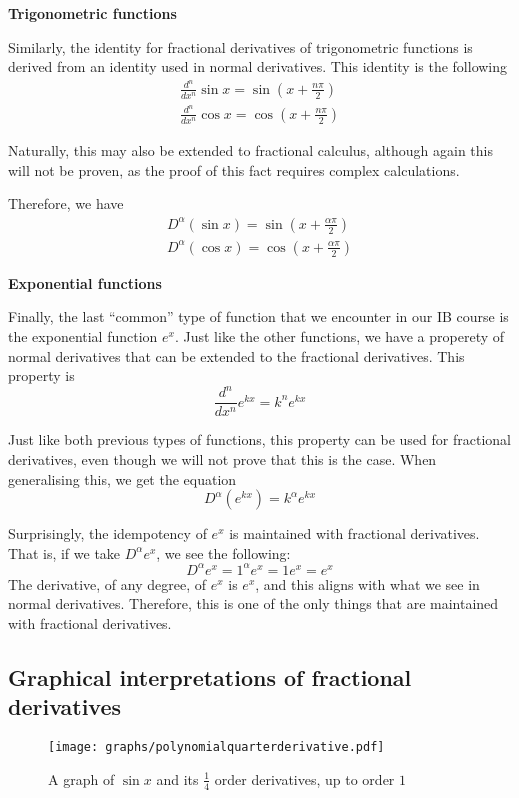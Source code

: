 \documentclass{article}
\def\graphscale{0.7}
\begin{document}
\textbf{Trigonometric functions}

Similarly, the identity for fractional derivatives of trigonometric functions
is derived from an identity used in normal derivatives. This identity is the
following
\begin{gather*}
\frac{d^n}{dx^n} \sin{x} = \sin\left(x + \frac{n\pi}{2}\right) \\
\frac{d^n}{dx^n} \cos{x} = \cos\left(x + \frac{n\pi}{2}\right)
\end{gather*}
\parencite{simplybeautifulart2016}

Naturally, this may also be extended to fractional calculus, although again
this will not be proven, as the proof of this fact requires complex
calculations.

Therefore, we have
\begin{gather*}
D^\alpha \left(\sin{x}\right) = \sin\left(x + \frac{\alpha\pi}{2}\right) \\
D^\alpha \left(\cos{x}\right) = \cos\left(x + \frac{\alpha\pi}{2}\right)
\end{gather*}

\textbf{Exponential functions}

Finally, the last ``common'' type of function that we encounter in our IB
course is the exponential function $e^x$. Just like the other functions, we
have a properety of normal derivatives that can be extended to the fractional
derivatives. This property is
$$
\frac{d^n}{dx^n} e^{kx} = k^ne^{kx}
$$
\parencite{dietrich2023}

Just like both previous types of functions, this property can be used for
fractional derivatives, even though we will not prove that this is the case.
When generalising this, we get the equation
$$
D^\alpha \left(e^{kx}\right) = k^\alpha e^{kx}
$$

Surprisingly, the idempotency of $e^x$ is maintained with fractional
derivatives. That is, if we take $D^\alpha e^x$, we see the following:
$$
D^\alpha e^x = 1^\alpha e^x = 1 e^x = e^x
$$
The derivative, of any degree, of $e^x$ is $e^x$, and this aligns with what we
see in normal derivatives. Therefore, this is one of the only things that are
maintained with fractional derivatives.

\subsection{Graphical interpretations of fractional derivatives}

\begin{figure}[H]
	\centering
	\texttt{[image: graphs/polynomialquarterderivative.pdf]}
	\caption{A graph of $\sin{x}$ and its $\frac{1}{4}$ order derivatives, up to order $1$} \label{polynomialfractionalgraph}
\end{figure}
\end{document}
